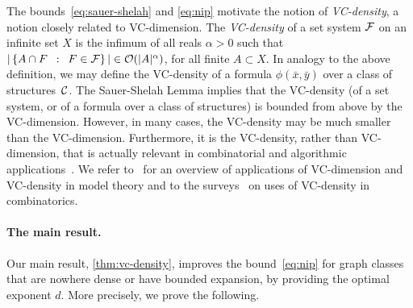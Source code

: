 \medskip
The bounds~\eqref{eq:sauer-shelah} and \eqref{eq:nip} motivate the notion of \emph{VC-density}, a notion closely related to VC-dimension.
The \emph{VC-density} of a set system $\cal F$
on an infinite set $X$ is the infimum of all reals $\alpha>0$ such that 
$|\setof{A\cap F}{F\in \cal F}|\in \Oof(|A|^\alpha)$, for all finite $A\subset X$. In analogy to the above definition,
we may define the VC-density of a formula $\phi(\bar x,\bar y)$ over a class of structures~$\cal C$. The Sauer-Shelah Lemma
implies that the VC-density (of a set system, or of a formula over a class of structures) is bounded from above by the VC-dimension. However, in many cases, the VC-density may be much smaller than the VC-dimension. Furthermore, it is the VC-density, rather than VC-dimension, that is actually relevant in combinatorial
and algorithmic applications~\cite{matouvsek1998geometric}.
%
We refer to~\cite{aschenbrenner2016vapnik} for an overview of 
applications of VC-dimension and VC-density in model
theory and to the surveys~\cite{furedi1991traces,matouvsek1998geometric} 
on uses of VC-density in
combinatorics. 



\paragraph{The main result.}
Our main result, \cref{thm:vc-density}, improves the bound~\eqref{eq:nip} for graph classes that are nowhere dense or have bounded expansion,
by providing the optimal exponent $d$. More precisely, we prove the following.


